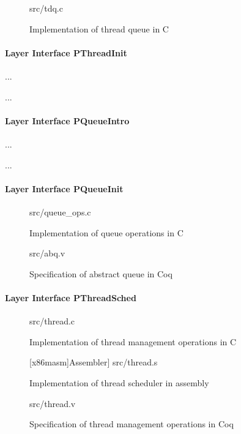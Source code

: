 \begin{figure}
	 {src/tdq.c}
	\caption{Implementation of thread queue in C}
	\label{fig:tdq_c}
\end{figure}

\paragraph{Layer Interface PThreadInit}
...

...


\paragraph{Layer Interface PQueueIntro}
...

...

\paragraph{Layer Interface PQueueInit}

\begin{figure}
	 {src/queue_ops.c}
	\caption{Implementation of queue operations in C}
	\label{fig:queue_ops_c}
\end{figure}


\begin{figure}
	 {src/abq.v}
	\caption{Specification of abstract queue in Coq}
	\label{fig:abq_v}
\end{figure}

\paragraph{Layer Interface PThreadSched}

\begin{figure}
	 {src/thread.c}
	\caption{Implementation of thread management operations in C}
	\label{fig:thread_c}
\end{figure}

\begin{figure}
	{[x86masm]Assembler}] {src/thread.s}
	\caption{Implementation of thread scheduler in assembly}
	\label{fig:thread_s}
\end{figure}



\begin{figure}
	 {src/thread.v}
	\caption{Specification of thread management operations in Coq}
	\label{fig:thread_v}
\end{figure}


